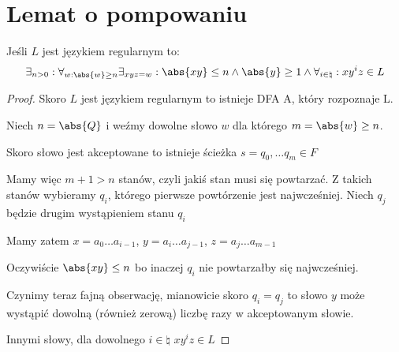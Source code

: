 \section{Lemat o pompowaniu}
\begin{theorem}[O pompowaniu]
    Jeśli \( L \) jest językiem regularnym to:
    \[
        \exists_{n > 0} : \forall_{w : \abs{w} \geq n} \exists_{xyz = w} : \abs{xy} \leq n \land \abs{y} \geq 1 \land \forall_{i \in \natural} : xy^iz \in L
    \]
\end{theorem}
\begin{proof}
    Skoro \( L \) jest językiem regularnym to istnieje DFA A, który rozpoznaje L.
    
    Niech \( n = \abs{Q} \) i weźmy dowolne słowo \( w \) dla którego \( m = \abs{w} \geq n \).
    
    Skoro słowo jest akceptowane to istnieje ścieżka \( s = q_0, \dots q_m \in F \)
    
    Mamy więc \( m + 1 > n \) stanów, czyli jakiś stan musi się powtarzać. 
    Z takich stanów wybieramy \( q_i \), którego pierwsze powtórzenie jest najwcześniej. Niech \( q_j \) będzie drugim wystąpieniem stanu \( q_i \)
    
    Mamy zatem \( x = a_0\dots a_{i-1} \), \( y = a_i\dots a_{j-1} \), \( z = a_j \dots a_{m-1} \)
    
    Oczywiście \( \abs{xy} \leq n \) bo inaczej \( q_i \) nie powtarzałby się najwcześniej.
    
    Czynimy teraz fajną obserwację, mianowicie skoro  \( q_i = q_j \) to słowo \( y \) może wystąpić dowolną (również zerową) liczbę razy w akceptowanym słowie.
    
    Innymi słowy, dla dowolnego \( i \in \natural \) \( xy^iz \in L \)
\end{proof}
